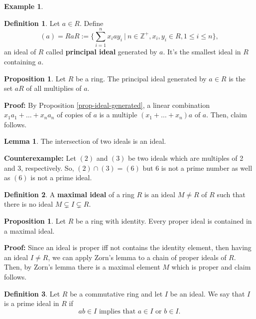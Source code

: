 \documentclass[11pt]{amsbook}%
\theoremstyle{plain}
\theoremstyle{definition}
\newtheorem{definition*}{Definition}
\newtheorem*{example*}{Example}
\newtheorem{lemma}{Lemma}
\newtheorem{proposition}[theorem]{Proposition}
\newtheorem{proposition*}{Proposition}
\numberwithin{equation}{section}
\newcommand{\ZZ}{\mathbb Z}
\renewcommand{\proof}{ \textbf{Proof: }}
\renewcommand{\counterexample}{ \textbf{Counterexample: }}
\begin{document}
\begin{example*}
\begin{definition*}
  \label{def-principal-ideal}
  Let $a \in R$. Define
  $$
  (a) = RaR := \{\sum_{i=1}^{n} x_{i}ay_{i} \ | \ n \in \ZZ^{+}, x_{i}, y_{i} \in R, 1 \leq i \leq n\},
  $$
  an ideal of $R$ called \textbf{principal ideal} generated by $a$. It's the smallest ideal
  in $R$ containing $a$.
\end{definition*}

\begin{proposition*}
  Let $R$ be a ring. The principal ideal generated by $a \in R$ is the set $aR$ of all multiplies of $a$.
\end{proposition*} \vspace{1.8em}
\proof By Proposition \ref{prop-ideal-generated}, a linear combination $x_{1}a_{1} + \dots + x_{n}a_{n}$
of copies of $a$ is a multiple $(x_{1} + \dots + x_{n})a$ of $a$. Then, claim follows. \qedsymbol

\begin{lemma}
  The intersection of two ideals is an ideal.
\end{lemma} \vspace{1.8em}
\counterexample Let $(2)$ and $(3)$ be two ideals which are multiples of 2 and 3, respectively.
So, $(2) \cap (3) = (6)$ but 6 is not a prime number as well as $(6)$ is not a prime ideal. \qedsymbol

\begin{definition*}
  \label{def-maximal-ideal}
  A \textbf{maximal ideal} of a ring $R$ is an ideal $M \neq R$ of $R$ such that there is no
  ideal $M \subsetneq I \subsetneq R$.
\end{definition*}

\begin{proposition}
  Let $R$ be a ring with identity. Every proper ideal is contained in a maximal ideal.
\end{proposition} \vspace{1.8em}
\proof Since an ideal is proper iff not contains the identity element, then having an ideal
$I \neq R$, we can apply Zorn's lemma to a chain of proper ideals of $R$. Then, by Zorn's lemma
there is a maximal element $M$ which is proper and claim follows. \qedsymbol

\begin{definition*}
  \label{def-prime-ideal}
  Let $R$ be a commutative ring and let $I$ be an ideal. We say that $I$
  is a prime ideal in $R$ if
  $$
  ab \in I \text{ implies that } a \in I \text{ or } b \in I.
  $$
\end{definition*}


\end{example*}
\end{document}
